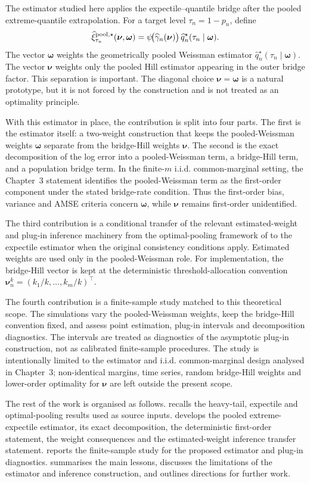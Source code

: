 The estimator studied here applies the expectile--quantile bridge after the
pooled extreme-quantile extrapolation. For a target level
\(\tau_n=1-p_n\), define
\[
  \widehat\xi_{\tau_n}^{\mathrm{pool},\star}(\bm\nu,\bm\omega)
  =
  \psi\!\big(\widehat\gamma_n(\bm\nu)\big)\,
  \widehat q_n^\star(\tau_n\mid\bm\omega).
\]
The vector \(\bm\omega\) weights the geometrically pooled Weissman estimator
\(\widehat q_n^\star(\tau_n\mid\bm\omega)\). The vector \(\bm\nu\) weights
only the pooled Hill estimator appearing in the outer bridge factor. This
separation is important. The diagonal choice \(\bm\nu=\bm\omega\) is a
natural prototype, but it is not forced by the construction and is not treated
as an optimality principle.

With this estimator in place, the contribution is split into four parts. The
first is the estimator itself: a two-weight construction that keeps the
pooled-Weissman weights \(\bm\omega\) separate from the bridge-Hill weights
\(\bm\nu\). The second is the exact decomposition of the log error into a
pooled-Weissman term, a bridge-Hill term, and a population bridge term. In the
finite-\(m\) i.i.d. common-marginal setting, the Chapter~3 statement identifies
the pooled-Weissman term as the first-order component under the stated
bridge-rate condition. Thus the first-order bias, variance and AMSE criteria
concern \(\bm\omega\), while \(\bm\nu\) remains first-order unidentified.

The third contribution is a conditional transfer of the relevant
estimated-weight and plug-in inference machinery from the optimal-pooling
framework of \textcite{DaouiaPadoanStupfler2021} to the expectile estimator
when the original consistency conditions apply. Estimated weights are used only
in the pooled-Weissman role. For implementation, the bridge-Hill vector is kept
at the deterministic threshold-allocation convention
\(\bm\nu_n^k=(k_1/k,\ldots,k_m/k)^\top\).

The fourth contribution is a finite-sample study matched to this theoretical
scope. The simulations vary the pooled-Weissman weights, keep the bridge-Hill
convention fixed, and assess point estimation, plug-in intervals and
decomposition diagnostics. The intervals are treated as diagnostics of the
asymptotic plug-in construction, not as calibrated finite-sample procedures.
The study is intentionally limited to the estimator and i.i.d. common-marginal
design analysed in Chapter~3; non-identical margins, time series, random
bridge-Hill weights and lower-order optimality for \(\bm\nu\) are left outside
the present scope.

The rest of the work is organised as follows.  recalls
the heavy-tail, expectile and optimal-pooling results used as source inputs.
 develops the pooled extreme-expectile estimator, its
exact decomposition, the deterministic first-order statement, the weight
consequences and the estimated-weight inference transfer statement.
 reports the finite-sample study for the proposed
estimator and plug-in diagnostics.  summarises the main
lessons, discusses the limitations of the estimator and inference construction,
and outlines directions for further work.
